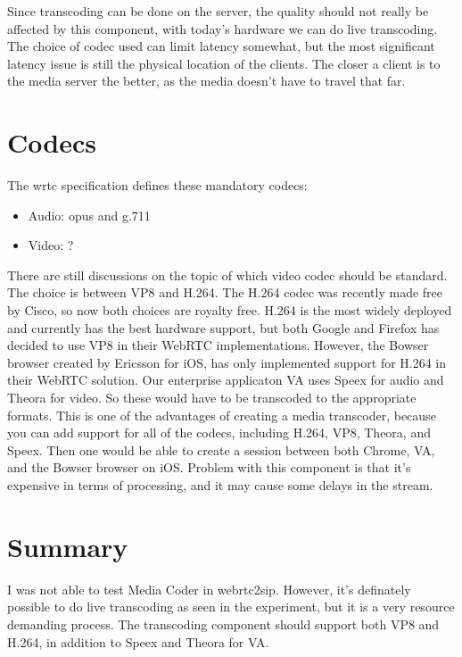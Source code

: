 Since transcoding can be done on the server, the quality should not really be affected by this component, with today's hardware we can do live transcoding. The choice of codec used can limit latency somewhat, but the most significant latency issue is still the physical location of the clients. The closer a client is to the media server the better, as the media doesn't have to travel that far.

\section{Codecs}
\label{sec:codecs}

The \gls{wrtc} specification defines these mandatory codecs:
\begin{itemize}
    \item Audio: opus and g.711
    \item Video: ?
\end{itemize}

There are still discussions on the topic of which video codec should be standard. The choice is between VP8 and H.264. The H.264 codec was recently made free by Cisco\cite{h264-free}, so now both choices are royalty free. H.264 is the most widely deployed and currently has the best hardware support, but both Google and Firefox has decided to use VP8 in their WebRTC implementations. However, the Bowser browser created by Ericsson for iOS, has only implemented support for H.264 in their WebRTC solution. Our enterprise applicaton VA uses Speex for audio and Theora for video. So these would have to be transcoded to the appropriate formats. This is one of the advantages of creating a media transcoder, because you can add support for all of the codecs, including H.264, VP8, Theora, and Speex. Then one would be able to create a session between both Chrome, VA, and the Bowser browser on iOS. Problem with this component is that it's expensive in terms of processing, and it may cause some delays in the stream.

\section{Summary}
I was not able to test Media Coder in webrtc2sip. However, it's definately possible to do live transcoding as seen in the experiment, but it is a very resource demanding process. The transcoding component should support both VP8 and H.264, in addition to Speex and Theora for VA.
